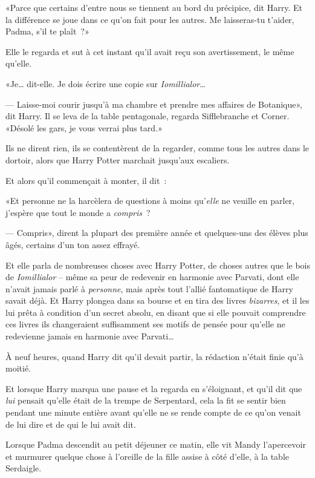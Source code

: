 «Parce que certains d'entre nous se tiennent au bord du précipice, dit Harry. Et la différence se joue dans ce qu'on fait pour les autres. Me laisseras-tu t'aider, Padma, s'il te plaît~?»

Elle le regarda et sut à cet instant qu'il avait reçu son avertissement, le même qu'elle.

«Je… dit-elle. Je dois écrire une copie sur \emph{Iomillialor}…

--- Laisse-moi courir jusqu'à ma chambre et prendre mes affaires de Botanique», dit Harry. Il se leva de la table pentagonale, regarda Sifflebranche et Corner. «Désolé les gars, je vous verrai plus tard.»

Ils ne dirent rien, ils se contentèrent de la regarder, comme tous les autres dans le dortoir, alors que Harry Potter marchait jusqu'aux escaliers.

Et alors qu'il commençait à monter, il dit~:

«Et personne ne la harcèlera de questions à moins qu'\emph{elle} ne veuille en parler, j'espère que tout le monde a \emph{compris}~?

--- Compris», dirent la plupart des première année et quelques-uns des élèves plus âgés, certains d'un ton assez effrayé.

\later

Et elle parla de nombreuses choses avec Harry Potter, de choses autres que le bois de \emph{Iomillialor} -- même sa peur de redevenir en harmonie avec Parvati, dont elle n'avait jamais parlé à \emph{personne}, mais après tout l'allié fantomatique de Harry savait déjà. Et Harry plongea dans sa bourse et en tira des livres \emph{bizarres}, et il les lui prêta à condition d'un secret absolu, en disant que si elle pouvait comprendre ces livres ils changeraient suffisamment ses motifs de pensée pour qu'elle ne redevienne jamais en harmonie avec Parvati…

À neuf heures, quand Harry dit qu'il devait partir, la rédaction n'était finie qu'à moitié.

Et lorsque Harry marqua une pause et la regarda en s'éloignant, et qu'il dit que \emph{lui} pensait qu'elle était de la trempe de Serpentard, cela la fit se sentir bien pendant une minute entière avant qu'elle ne se rende compte de ce qu'on venait de lui dire et de qui le lui avait dit.

\later

Lorsque Padma descendit au petit déjeuner ce matin, elle vit Mandy l'apercevoir et murmurer quelque chose à l'oreille de la fille assise à côté d'elle, à la table Serdaigle.

